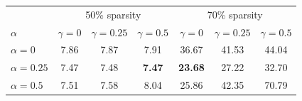 \begin{tabular}{lcccccc}
\toprule
 & \multicolumn{3}{c}{50\% sparsity} & \multicolumn{3}{c}{70\% sparsity} \\
$\alpha$ & $\gamma{=}0$ & $\gamma{=}0.25$ & $\gamma{=}0.5$ & $\gamma{=}0$ & $\gamma{=}0.25$ & $\gamma{=}0.5$ \\
\midrule
$\alpha{=}0$ & 7.86 & 7.87 & 7.91 & 36.67 & 41.53 & 44.04 \\
$\alpha{=}0.25$ & 7.47 & 7.48 & \textbf{7.47} & \textbf{23.68} & 27.22 & 32.70 \\
$\alpha{=}0.5$ & 7.51 & 7.58 & 8.04 & 25.86 & 42.35 & 70.79 \\
\bottomrule
\end{tabular}
